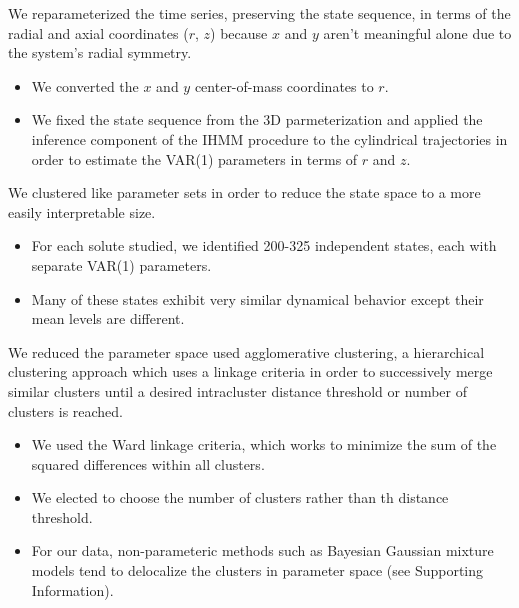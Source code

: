 \documentclass{article}
\begin{document}
  We reparameterized the time series, preserving the state sequence, in terms
  of the radial and axial coordinates ($r$, $z$) because $x$ and $y$ aren't 
  meaningful alone due to the system's radial symmetry.
  \begin{itemize}
    \item We converted the $x$ and $y$ center-of-mass coordinates to $r$.
    \item We fixed the state sequence from the 3D parmeterization and applied the
    inference component of the IHMM procedure to the cylindrical trajectories in
    order to estimate the VAR(1) parameters in terms of $r$ and $z$.
  \end{itemize} 
  
  \noindent We clustered like parameter sets in order to reduce the state space to
  a more easily interpretable size.
  \begin{itemize}
  	\item For each solute studied, we identified 200-325 independent states, each
   	with separate VAR(1) parameters.
   	\item Many of these states exhibit very similar dynamical behavior except their
   	mean levels are different.
  \end{itemize}
  
  We reduced the parameter space used agglomerative clustering, a hierarchical
  clustering approach which uses a linkage criteria in order to successively merge
  similar clusters until a desired intracluster distance threshold or number of
  clusters is reached. 
  \begin{itemize}
   	\item We used the Ward linkage criteria, which works to minimize the sum of
   	the squared differences within all clusters.
   	\item We elected to choose the number of clusters rather than th distance
   	threshold.
   	\item For our data, non-parameteric methods such as Bayesian Gaussian mixture
   	models tend to delocalize the clusters in parameter space (see Supporting
   	Information).
  \end{itemize}  
  
\end{document}
